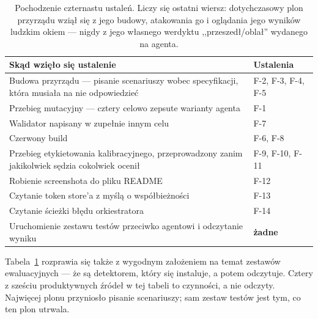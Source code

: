 \documentclass[11pt,a4paper]{article}
\begin{document}
\begin{table}[htbp]
\centering
\small
\begin{tabularx}{\textwidth}{@{}Xp{3.4cm}@{}}
\toprule
\textbf{Skąd wzięło się ustalenie} & \textbf{Ustalenia} \\
\midrule
Budowa przyrządu --- pisanie scenariuszy wobec specyfikacji, która musiała na nie
odpowiedzieć & F-2, F-3, F-4, F-5 \\
Przebieg mutacyjny --- cztery celowo zepsute warianty agenta & F-1 \\
Walidator napisany w zupełnie innym celu & F-7 \\
Czerwony build & F-6, F-8 \\
Przebieg etykietowania kalibracyjnego, przeprowadzony zanim jakikolwiek sędzia cokolwiek ocenił & F-9, F-10, F-11 \\
Robienie screenshota do pliku README & F-12 \\
Czytanie token store'a z myślą o współbieżności & F-13 \\
Czytanie ścieżki błędu orkiestratora & F-14 \\
\midrule
Uruchomienie zestawu testów przeciwko agentowi i odczytanie wyniku & \textcolor{accentred}{\textbf{żadne}} \\
\bottomrule
\end{tabularx}
\caption{Pochodzenie czternastu ustaleń. Liczy się ostatni wiersz: dotychczasowy plon przyrządu wziął się z jego budowy, atakowania go i oglądania jego wyników ludzkim okiem --- nigdy z jego własnego werdyktu ,,przeszedł/oblał'' wydanego na agenta.}
\label{tab:provenance}
\end{table}

Tabela~\ref{tab:provenance} rozprawia się także z wygodnym założeniem na temat
zestawów ewaluacyjnych --- że są detektorem, który się instaluje, a potem
odczytuje. Cztery z sześciu produktywnych źródeł w tej tabeli to czynności, a nie
odczyty. Najwięcej plonu przyniosło pisanie scenariuszy; sam zestaw testów jest
tym, co ten plon utrwala.
\end{document}
